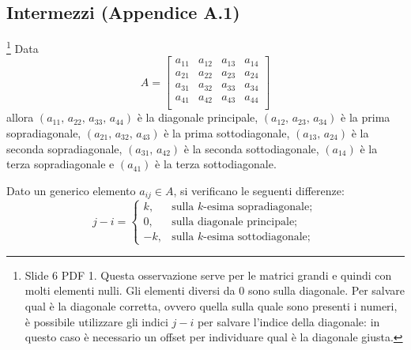 \subsection{Intermezzi (Appendice A.1)}
\begin{remark}\label{re:diagonali}\footnote{Slide 6 PDF 1. Questa osservazione serve per le matrici grandi e quindi con molti elementi nulli. Gli elementi diversi da 0 sono sulla diagonale. Per salvare qual è la diagonale corretta, ovvero quella sulla quale sono presenti i numeri, è possibile utilizzare gli indici $j-i$ per salvare l'indice della diagonale: in questo caso è necessario un offset per individuare qual è la diagonale giusta.}
    Data
    \begin{equation}
        A=\begin{bmatrix}
            a_{11} & a_{12} & a_{13} & a_{14}\\
            a_{21} & a_{22} & a_{23} & a_{24}\\
            a_{31} & a_{32} & a_{33} & a_{34}\\
            a_{41} & a_{42} & a_{43} & a_{44}\\
        \end{bmatrix}
    \end{equation}
    allora $(a_{11},\, a_{22},\, a_{33},\, a_{44})$ è la diagonale principale, $(a_{12},\, a_{23},\, a_{34})$ è la prima sopradiagonale, $(a_{21},\, a_{32},\, a_{43})$ è la prima sottodiagonale, $(a_{13},\, a_{24})$ è la seconda sopradiagonale,  $(a_{31},\, a_{42})$ è la seconda sottodiagonale, $(a_{14})$ è la terza sopradiagonale e $(a_{41})$ è la terza sottodiagonale. 
\end{remark}

\begin{example}
    Dato un generico elemento $a_{ij}\in A$, si verificano le seguenti differenze: 
    \begin{equation*}
        j-i=\begin{cases}
        k, &\text{sulla $k$-esima sopradiagonale};\\
        0, &\text{sulla diagonale principale};\\
        -k, &\text{sulla $k$-esima sottodiagonale};
    \end{cases}
    \end{equation*}
\end{example}

